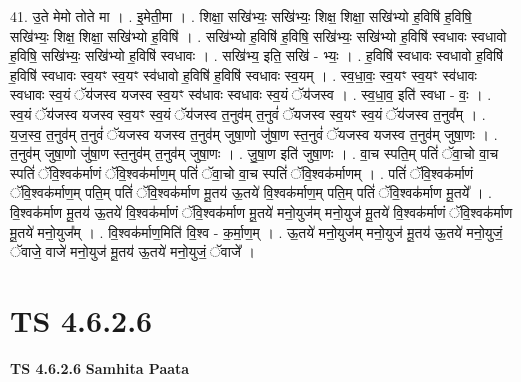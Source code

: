 \documentclass[17pt]{extarticle}
\begin{document}
41. उ॒ते मेमो तोते मा । . इ॒मेती॒मा । . शिक्षा॒ सखि॑भ्यः॒ सखि॑भ्यः॒ शिक्ष॒ शिक्षा॒ सखि॑भ्यो ह॒विषि॑ ह॒विषि॒ सखि॑भ्यः॒ शिक्ष॒ शिक्षा॒ सखि॑भ्यो ह॒विषि॑ । . सखि॑भ्यो ह॒विषि॑ ह॒विषि॒ सखि॑भ्यः॒ सखि॑भ्यो ह॒विषि॑ स्वधावः स्वधावो ह॒विषि॒ सखि॑भ्यः॒ सखि॑भ्यो ह॒विषि॑ स्वधावः । . सखि॑भ्य॒ इति॒ सखि॑ - भ्यः॒ । . ह॒विषि॑ स्वधावः स्वधावो ह॒विषि॑ ह॒विषि॑ स्वधावः स्व॒यꣳ स्व॒यꣳ स्व॑धावो ह॒विषि॑ ह॒विषि॑ स्वधावः स्व॒यम् । . स्व॒धा॒वः॒ स्व॒यꣳ स्व॒यꣳ स्व॑धावः स्वधावः स्व॒यं ॅय॑जस्व यजस्व स्व॒यꣳ स्व॑धावः स्वधावः स्व॒यं ॅय॑जस्व । . स्व॒धा॒व॒ इति॑ स्वधा - वः॒ । . स्व॒यं ॅय॑जस्व यजस्व स्व॒यꣳ स्व॒यं ॅय॑जस्व त॒नुव॑म् त॒नुवं॑ ॅयजस्व स्व॒यꣳ स्व॒यं ॅय॑जस्व त॒नुव᳚म् । . य॒ज॒स्व॒ त॒नुव॑म् त॒नुवं॑ ॅयजस्व यजस्व त॒नुव॑म् जुषा॒णो जु॑षा॒ण स्त॒नुवं॑ ॅयजस्व यजस्व त॒नुव॑म् जुषा॒णः । . त॒नुव॑म् जुषा॒णो जु॑षा॒ण स्त॒नुव॑म् त॒नुव॑म् जुषा॒णः । . जु॒षा॒ण इति॑ जुषा॒णः । . वा॒च स्पति॒म् पतिं॑ ॅवा॒चो वा॒च स्पतिं॑ ॅवि॒श्वक॑र्माणं ॅवि॒श्वक॑र्माण॒म् पतिं॑ ॅवा॒चो 
वा॒च स्पतिं॑ ॅवि॒श्वक॑र्माणम् । . पतिं॑ ॅवि॒श्वक॑र्माणं ॅवि॒श्वक॑र्माण॒म् पति॒म् पतिं॑ ॅवि॒श्वक॑र्माण मू॒तय॑ ऊ॒तये॑ वि॒श्वक॑र्माण॒म् पति॒म् पतिं॑ ॅवि॒श्वक॑र्माण मू॒तये᳚ । . वि॒श्वक॑र्माण मू॒तय॑ ऊ॒तये॑ वि॒श्वक॑र्माणं ॅवि॒श्वक॑र्माण मू॒तये॑ मनो॒युज॑म् मनो॒युज॑ मू॒तये॑ वि॒श्वक॑र्माणं ॅवि॒श्वक॑र्माण मू॒तये॑ मनो॒युज᳚म् । . वि॒श्वक॑र्माण॒मिति॑ वि॒श्व - क॒र्मा॒ण॒म् । . ऊ॒तये॑ मनो॒युज॑म् मनो॒युज॑ मू॒तय॑ ऊ॒तये॑ मनो॒युजं॒ ॅवाजे॒ वाजे॑ मनो॒युज॑ मू॒तय॑ ऊ॒तये॑ मनो॒युजं॒ ॅवाजे᳚ । \newline
\pagebreak
{}

\section{ TS 4.6.2.6 }

\textbf{TS 4.6.2.6 } \newline
\textbf{Samhita Paata} \newline
\end{document}
